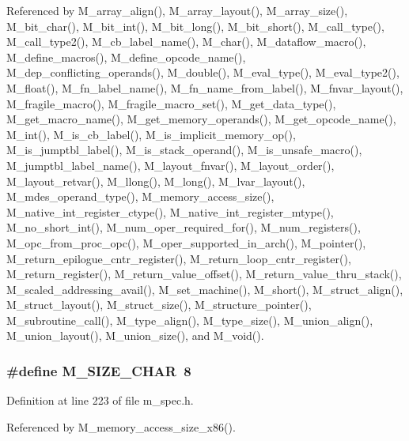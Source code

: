 Referenced by M\_\-array\_\-align(), M\_\-array\_\-layout(), M\_\-array\_\-size(), M\_\-bit\_\-char(), M\_\-bit\_\-int(), M\_\-bit\_\-long(), M\_\-bit\_\-short(), M\_\-call\_\-type(), M\_\-call\_\-type2(), M\_\-cb\_\-label\_\-name(), M\_\-char(), M\_\-dataflow\_\-macro(), M\_\-define\_\-macros(), M\_\-define\_\-opcode\_\-name(), M\_\-dep\_\-conflicting\_\-operands(), M\_\-double(), M\_\-eval\_\-type(), M\_\-eval\_\-type2(), M\_\-float(), M\_\-fn\_\-label\_\-name(), M\_\-fn\_\-name\_\-from\_\-label(), M\_\-fnvar\_\-layout(), M\_\-fragile\_\-macro(), M\_\-fragile\_\-macro\_\-set(), M\_\-get\_\-data\_\-type(), M\_\-get\_\-macro\_\-name(), M\_\-get\_\-memory\_\-operands(), M\_\-get\_\-opcode\_\-name(), M\_\-int(), M\_\-is\_\-cb\_\-label(), M\_\-is\_\-implicit\_\-memory\_\-op(), M\_\-is\_\-jumptbl\_\-label(), M\_\-is\_\-stack\_\-operand(), M\_\-is\_\-unsafe\_\-macro(), M\_\-jumptbl\_\-label\_\-name(), M\_\-layout\_\-fnvar(), M\_\-layout\_\-order(), M\_\-layout\_\-retvar(), M\_\-llong(), M\_\-long(), M\_\-lvar\_\-layout(), M\_\-mdes\_\-operand\_\-type(), M\_\-memory\_\-access\_\-size(), M\_\-native\_\-int\_\-register\_\-ctype(), M\_\-native\_\-int\_\-register\_\-mtype(), M\_\-no\_\-short\_\-int(), M\_\-num\_\-oper\_\-required\_\-for(), M\_\-num\_\-registers(), M\_\-opc\_\-from\_\-proc\_\-opc(), M\_\-oper\_\-supported\_\-in\_\-arch(), M\_\-pointer(), M\_\-return\_\-epilogue\_\-cntr\_\-register(), M\_\-return\_\-loop\_\-cntr\_\-register(), M\_\-return\_\-register(), M\_\-return\_\-value\_\-offset(), M\_\-return\_\-value\_\-thru\_\-stack(), M\_\-scaled\_\-addressing\_\-avail(), M\_\-set\_\-machine(), M\_\-short(), M\_\-struct\_\-align(), M\_\-struct\_\-layout(), M\_\-struct\_\-size(), M\_\-structure\_\-pointer(), M\_\-subroutine\_\-call(), M\_\-type\_\-align(), M\_\-type\_\-size(), M\_\-union\_\-align(), M\_\-union\_\-layout(), M\_\-union\_\-size(), and M\_\-void().
\subsubsection{\setlength{\rightskip}{0pt plus 5cm}\#define M\_\-SIZE\_\-CHAR~8}\label{m__spec_8h_783421b1175b18148eaae4b7745113d0}




Definition at line 223 of file m\_\-spec.h.

Referenced by M\_\-memory\_\-access\_\-size\_\-x86().
